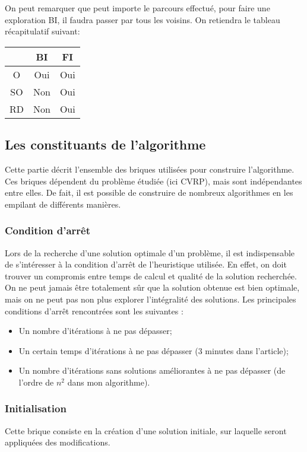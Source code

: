 \documentclass[a4paper,11pt]{article}%
\begin{document}
On peut remarquer que peut importe le parcours effectué, pour faire une exploration BI, il faudra passer par tous les voisins. On retiendra le tableau récapitulatif suivant:

\begin{center}
\begin{tabular}{|c|c|c|}
   \hline
     & BI & FI  \\
   \hline
   O & Oui & Oui \\
   \hline
   SO & Non & Oui \\
   \hline
   RD & Non & Oui  \\
   \hline
\end{tabular}
\end{center}


\subsection{Les constituants de l'algorithme}
Cette partie décrit l'ensemble des briques utilisées pour construire l'algorithme. Ces briques dépendent du problème étudiée (ici CVRP), mais sont indépendantes entre elles. De fait, il est possible de construire de nombreux algorithmes en les empilant de différents manières.

\subsubsection{Condition d'arrêt}

Lors de la recherche d'une solution optimale d'un problème, il est indispensable de s'intéresser à la condition d'arrêt de l'heuristique utilisée. En effet, on doit trouver un compromis entre temps de calcul et qualité de la solution recherchée. On ne peut jamais être totalement sûr que la solution obtenue est bien optimale, mais on ne peut pas non plus explorer l'intégralité des solutions. Les principales conditions d'arrêt rencontrées sont les suivantes :
\begin{itemize}
\item Un nombre d'itérations à ne pas dépasser;
\item Un certain temps d'itérations à ne pas dépasser (3 minutes dans l'article);
\item Un nombre d'itérations sans solutions améliorantes à ne pas dépasser (de l'ordre de $n^2$ dans mon algorithme). 
\end{itemize}

\subsubsection{Initialisation}
Cette brique consiste en la création d'une solution initiale, sur laquelle seront appliquées des modifications. 
\end{document}
